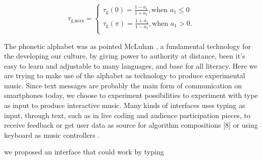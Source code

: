 \documentclass{aes2e}
\begin{document}
                              

\begin{equation}
\tau _{\textrm{g,max}}  = \left\{ \begin{array}{l}
 \tau _\textrm{g} (0) = \frac{{1 - a_1 }}{{1 + a_1 }},\textrm{when }a_1  \le 0 \\[4pt]
 \tau _\textrm{g} (\pi ) = \frac{{1 + a_1 }}{{1 - a_1 }},\textrm{when }a_1  > 0. \\
 \end{array} \right.\end{equation}

The phonetic alphabet was as pointed McLuhan \cite{mcluhan_understanding_1964}, a fundamental technology for the developing our culture, by giving power to authority at distance, been it's easy to learn and adjustable to many languages, and base for all literacy. Here we are trying to make use of the alphabet as technology to produce experimental music. Since text messages are probably the main form of communication on smartphones today, we choose to experiment possibilities to experiment with type as input to produce interactive music. Many kinds of interfaces uses typing as input, through text, such as in live coding \cite{Collins2003live} and audience participation pieces, to receive feedback \cite{noauthor_transglasphone_nodate} or get user data as source for algorithm compositions [8] or using keyboard as music controllers \cite{fiebrink_dont_2007}.

we proposed an interface that could work by typing



\end{document}
